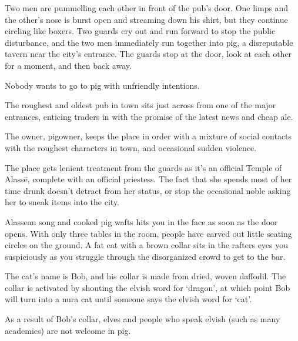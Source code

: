 \begin{multicols}{2}
\setcounter{list}{0}

\begin{boxtext}

	Two men are pummelling each other in front of the pub's door.
	 One limps and the other's nose is burst open and streaming down his shirt, but they continue circling like boxers.
	 Two guards cry out and run forward to stop the public disturbance, and the two men immediately run together into \gls{pig}, a disreputable tavern near the city's entrance.
	 The guards stop at the door, look at each other for a moment, and then back away.

Nobody wants to go to \gls{pig} with unfriendly intentions.

\end{boxtext}
 
The roughest and oldest pub in \gls{town} sits just across from one of the major entrances, enticing traders in with the promise of the latest news and cheap ale.

The owner, \gls{pigowner}, keeps the place in order with a mixture of social contacts with the roughest characters in \gls{town}, and occasional sudden violence.

The place gets lenient treatment from the guards as it's an official Temple of Alass\"{e}, complete with an official priestess.
The fact that she spends most of her time drunk doesn't detract from her status, or stop the occasional noble asking her to sneak items into the city.



\begin{boxtext}

	Alassean song and cooked pig wafts hits you in the face as soon as the door opens.  With only three tables in the room, people have carved out little seating circles on the ground.  A fat cat with a brown collar sits in the rafters eyes you suspiciously as you struggle through the disorganized crowd to get to the bar.

\end{boxtext}

The cat's name is Bob, and his collar is made from dried, woven daffodil.  The collar is activated by shouting the elvish word for `dragon', at which point Bob will turn into a nura cat until someone says the elvish word for `cat'.

As a result of Bob's collar, elves and people who speak elvish (such as many academics) are not welcome in \gls{pig}.


\end{multicols}
